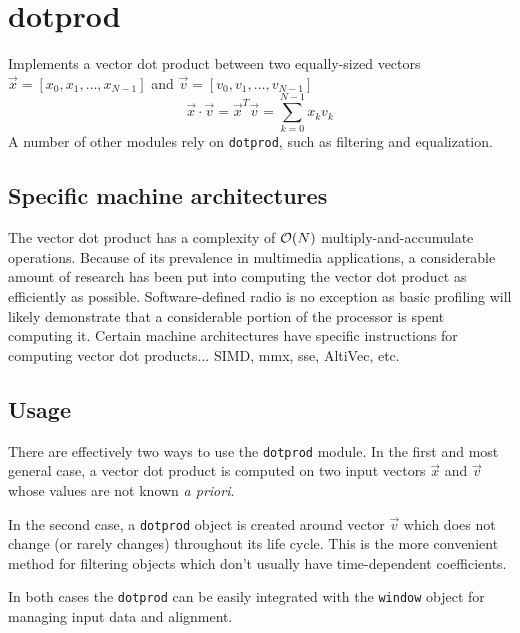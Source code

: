 % 
%

\section{dotprod}
\label{module:dotprod}
Implements a vector dot product between two equally-sized vectors
$\vec{x} = \left[x_0,x_1,\ldots,x_{N-1}\right]$ and
$\vec{v} = \left[v_0,v_1,\ldots,v_{N-1}\right]$
\[
    \vec{x} \cdot \vec{v}   =
    \vec{x}^T \vec{v}       =
    \sum_{k=0}^{N-1}x_k v_k
\]
A number of other modules rely on {\tt dotprod}, such as filtering and
equalization.

\subsection{Specific machine architectures}
\label{module:dotprod:arch}
The vector dot product has a complexity of $\mathcal{O}(N)$ multiply-and-accumulate
operations.
Because of its prevalence in multimedia applications, a considerable amount of
research has been put into computing the vector dot product as efficiently as
possible.
Software-defined radio is no exception as basic profiling will likely
demonstrate that a considerable portion of the processor is spent computing
it.
Certain machine architectures have specific instructions for computing vector
dot products... SIMD, mmx, sse, AltiVec, etc.

\subsection{Usage}
\label{module:dotprod:usage}
There are effectively two ways to use the {\tt dotprod} module.
In the first and most general case, a vector dot product is computed on two
input vectors $\vec{x}$ and $\vec{v}$ whose values are not known
{\it a priori}.

In the second case, a {\tt dotprod} object is created around vector $\vec{v}$
which does not change (or rarely changes) throughout its life cycle.
This is the more convenient method for filtering objects which don't usually
have time-dependent coefficients.



In both cases the {\tt dotprod} can be easily integrated with the
{\tt window} object for managing input data and alignment.
